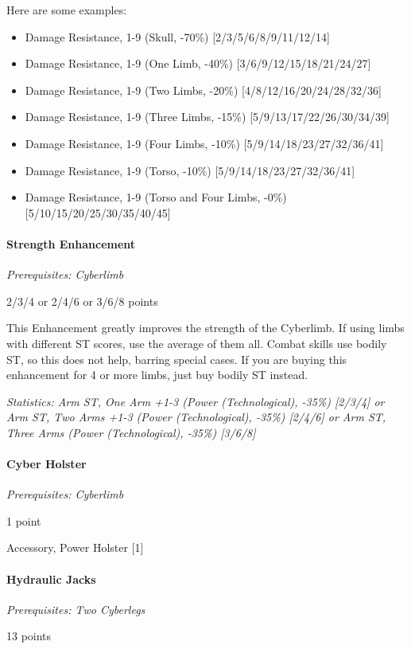 \begin{multicols*}{3}
	Here are some examples:
	
	\begin{itemize}
		\itemsep0em 
		\item Damage Resistance, 1-9 (Skull, -70\%) [2/3/5/6/8/9/11/12/14]
		\item Damage Resistance, 1-9 (One Limb, -40\%) [3/6/9/12/15/18/21/24/27]
		\item Damage Resistance, 1-9 (Two Limbs, -20\%) [4/8/12/16/20/24/28/32/36]
		\item Damage Resistance, 1-9 (Three Limbs, -15\%) [5/9/13/17/22/26/30/34/39]
		\item Damage Resistance, 1-9 (Four Limbs, -10\%) [5/9/14/18/23/27/32/36/41]
		\item Damage Resistance, 1-9 (Torso, -10\%) [5/9/14/18/23/27/32/36/41]
		\item Damage Resistance, 1-9 (Torso and Four Limbs, -0\%) [5/10/15/20/25/30/35/40/45]
	\end{itemize}
	
	\paragraph{Strength Enhancement}
	\textit{Prerequisites: Cyberlimb}
	\begin{flushright}
		2/3/4 or 2/4/6 or 3/6/8 points
	\end{flushright}

	This Enhancement greatly improves the strength of the Cyberlimb. If using limbs with different ST scores, use the average of them all. Combat skills use bodily ST, so this does not help, barring special cases. If you are buying this enhancement for 4 or more limbs, just buy bodily ST instead. 
	
	\textit{\textcolor{OliveGreen}{Statistics: Arm ST, One Arm +1-3 (Power (Technological), -35\%) [2/3/4] or Arm ST, Two Arms +1-3 (Power (Technological), -35\%) [2/4/6] or Arm ST, Three Arms (Power (Technological), -35\%) [3/6/8]}}
	
	
	\paragraph{Cyber Holster}
	\textit{Prerequisites: Cyberlimb}
	\begin{flushright}
		1 point
	\end{flushright}
	
	Accessory, Power Holster [1]
	
	\paragraph{Hydraulic Jacks}
	\textit{Prerequisites: Two Cyberlegs}
	\begin{flushright}
		13 points
	\end{flushright}
	

\end{multicols*}
